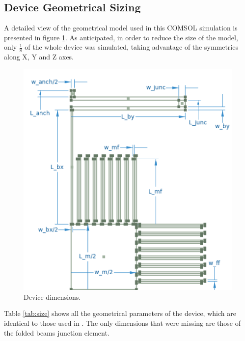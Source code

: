\documentclass[lettersize,journal]{IEEEtran}
\begin{document}
        \subsection{Device Geometrical Sizing}\label{ssec:geometry}
        A detailed view of the geometrical model used in this COMSOL simulation is presented in figure \ref{fig:dev_quotes}. As anticipated, in order to reduce the size of the model, only \(\frac{1}{8}\) of the whole device was simulated, taking advantage of the symmetries along X, Y and Z axes.
        
        \begin{figure}[h!]
            \centering
            \includegraphics[width=1.0\linewidth]{device_size.png}
            \caption{Device dimensions.}
            \label{fig:dev_quotes}
        \end{figure}
        
        Table \ref{tab:size} shows all the geometrical parameters of the device, which are identical to those used in \cite{original}. The only dimensions that were missing are those of the folded beams junction element.
        
\end{document}
